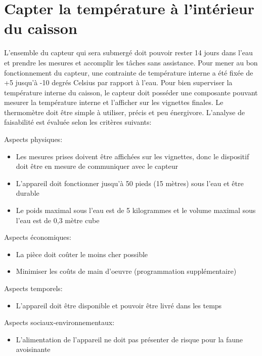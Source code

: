 

\section{Capter la température à l’intérieur du caisson}
\label{s:faisab_temp_caisson}

L’ensemble du capteur qui sera submergé doit pouvoir rester 14 jours dans l’eau et prendre les mesures et accomplir les tâches sans assistance. Pour mener au bon fonctionnement du capteur, une contrainte de température interne a été fixée de +5 jusqu’à -10 degrés Celsius par rapport à l’eau. Pour bien superviser la température interne du caisson, le capteur doit posséder une composante pouvant mesurer la température interne et l’afficher sur les vignettes finales. Le thermomètre doit être simple à utiliser, précis et peu énergivore. L’analyse de faisabilité est évaluée selon les critères suivants:


Aspects physiques:
\begin{itemize}
	\item Les mesures prises doivent être affichées sur les vignettes, donc le dispositif doit être         
	en mesure de communiquer avec le capteur 
	\item L’appareil doit fonctionner jusqu’à 50 pieds (15 mètres) sous l’eau et être durable
	\item Le poids maximal sous l’eau est de 5 kilogrammes et le volume maximal sous l’eau est                  
	de 0,3 mètre cube
\end{itemize}

Aspects économiques:
\begin{itemize}
	\item La pièce doit coûter le moins cher possible
	\item Minimiser les coûts de main d’oeuvre (programmation supplémentaire)

\end{itemize}

Aspects temporels:
\begin{itemize}
	\item L’appareil doit être disponible et pouvoir être livré dans les temps 

\end{itemize}

Aspects sociaux-environnementaux:
\begin{itemize}

	\item L’alimentation de l’appareil ne doit pas présenter de risque pour la faune avoisinante
\end{itemize}


